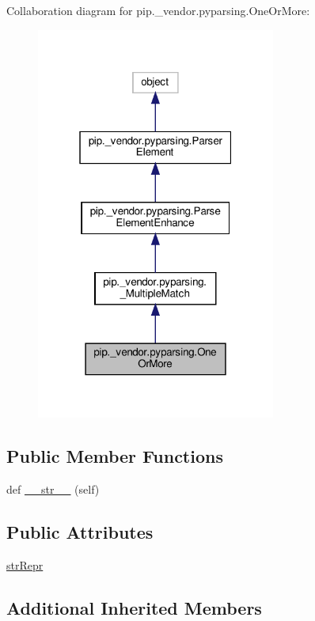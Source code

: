 Collaboration diagram for pip.\+\_\+vendor.\+pyparsing.\+One\+Or\+More\+:
\nopagebreak
\begin{figure}[H]
\begin{center}
\leavevmode
\includegraphics[width=223pt]{classpip_1_1__vendor_1_1pyparsing_1_1OneOrMore__coll__graph}
\end{center}
\end{figure}
\subsection*{Public Member Functions}
\begin{DoxyCompactItemize}
\item 
def \hyperlink{classpip_1_1__vendor_1_1pyparsing_1_1OneOrMore_a05a6d077598f5d88ac4b7d3dd1330f9f}{\+\_\+\+\_\+str\+\_\+\+\_\+} (self)
\end{DoxyCompactItemize}
\subsection*{Public Attributes}
\begin{DoxyCompactItemize}
\item 
\hyperlink{classpip_1_1__vendor_1_1pyparsing_1_1OneOrMore_aa07e4efeedbf25ec752ce44259343ada}{str\+Repr}
\end{DoxyCompactItemize}
\subsection*{Additional Inherited Members}


